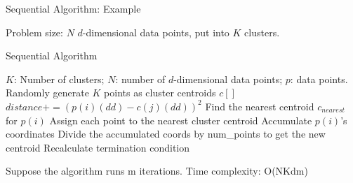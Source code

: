 \documentclass[
nopagebreaks,
style=klope,
fleqn]{powerdot}
\begin{document}
\begin{slide} {Sequential Algorithm: Example}
\begin{figure}[h]
  \end{figure}
  \begin{compactitem}
  \item{Problem size: $N$ $d$-dimensional data points, put into $K$ clusters.}
  \end{compactitem}
\end{slide}

\begin{slide} {Sequential Algorithm}
  \footnotesize
  \begin{algorithmic}[1]
    \INPUT $K$: Number of clusters; $N$: number of $d$-dimensional data points; $p$: data points. 
    \State Randomly generate $K$ points as cluster centroids $c[]$
    \State $distance += (p(i)(dd) - c(j)(dd))^2$
    \EndFor
    \EndFor
    \State Find the nearest centroid $c_{nearest}$ for $p(i)$
    \State Assign each point to the nearest cluster centroid
    \State Accumulate $p(i)$'s coordinates
    \State Divide the accumulated coords by num\_points to get the new centroid
    \EndFor
    \State Recalculate termination condition
    \EndWhile
    \EndFunction
  \end{algorithmic}
  \begin{compactitem}
    \vspace{.1in}
  \item{Suppose the algorithm runs m iterations. Time complexity: O(NKdm)}
  \end{compactitem}
\end{slide}
\end{document}
